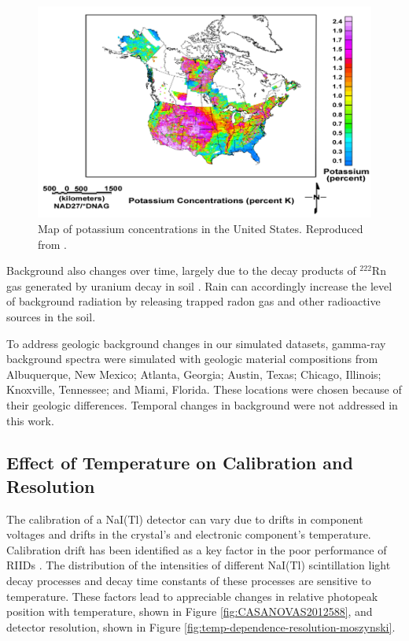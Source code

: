 \begin{figure}[H]
	\centering
	\includegraphics[trim=10 0 5 0, clip, width=1.0\linewidth]{images/USGS_k_conc}
	\caption{Map of potassium concentrations in the United States. Reproduced from \cite{USGS}.}
	\label{fig:USGS_k_conc}
\end{figure}

Background also changes over time, largely due to the decay products of $^{222}$Rn gas generated by uranium decay in soil \cite{knoll}. Rain can accordingly increase the level of background radiation by releasing trapped radon gas and other radioactive sources in the soil.

To address geologic background changes in our simulated datasets, gamma-ray background spectra were simulated with geologic material compositions from Albuquerque, New Mexico; Atlanta, Georgia; Austin, Texas; Chicago, Illinois; Knoxville, Tennessee; and Miami, Florida. These locations were chosen because of their geologic differences. Temporal changes in background were not addressed in this work.



\subsection{Effect of Temperature on Calibration and Resolution}


The calibration of a NaI(Tl) detector can vary due to drifts in component voltages and drifts in the crystal's and electronic component's temperature. Calibration drift has been identified as a key factor in the poor performance of RIIDs \cite{blackadar2003}. The distribution of the intensities of different NaI(Tl) scintillation light decay processes \cite{IANAKIEV2009432} and decay time constants of these processes \cite{MOSZYNSKI2006739} are sensitive to temperature. These factors lead to appreciable changes in relative photopeak position with temperature, shown in Figure \ref{fig:CASANOVAS2012588}, and detector resolution, shown in Figure \ref{fig:temp-dependence-resolution-moszynski}. 

